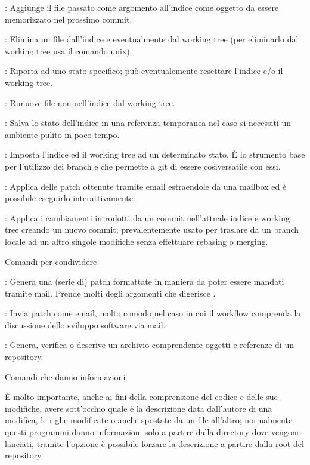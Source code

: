 \elemento{}: Aggiunge il file passato come argomento all'indice come
oggetto da essere memorizzato nel prossimo commit.

\elemento{}: Elimina un file dall'indice e eventualmente dal working tree
(per eliminarlo dal working tree usa il comando  unix).

\elemento{}: Riporta  ad uno stato specifico; pu\`o
eventualemente resettare l'indice e/o il working tree.

\elemento{}: Rimuove file non nell'indice dal working tree.

\elemento{}: Salva lo stato dell'indice in una referenza temporanea
nel caso si necessiti un ambiente pulito in poco tempo.

\elemento{}: Imposta l'indice ed il working tree ad un determinato 
stato. \`E lo strumento base per l'utilizzo dei branch e che permette a git di
essere cos\`\i versatile con essi.

\elemento{}: Applica delle patch ottenute tramite email estraendole da
una mailbox ed \`e possibile eseguirlo interattivamente.

\elemento{}: Applica i cambiamenti introdotti da un commit
nell'attuale indice e working tree creando un nuovo commit; prevalentemente
usato per traslare da un branch locale ad un altro singole modifiche senza
effettuare rebasing o merging.

\sezione Comandi per condividere

\elemento{}: Genera una (serie di) patch formattate in
maniera da poter essere mandati tramite mail. Prende molti degli argomenti che
digerisce .

\elemento{}: Invia patch come email, molto comodo nel caso in cui
il workflow comprenda la discussione dello sviluppo software via mail.

\elemento{}: Genera, verifica o descrive un archivio comprendente
oggetti e referenze di un repository.

\sezione Comandi che danno informazioni

\`E molto importante, anche ai fini della comprensione del codice e delle sue
modifiche, avere sott'occhio quale \`e la descrizione data dall'autore di una
modifica, le righe modificate o anche spostate da un file all'altro; normalmente
questi programmi danno informazioni solo a partire dalla directory dove vengono
lanciati, tramite l'opzione  \`e possibile forzare la
descrizione a partire dalla root del repository.


